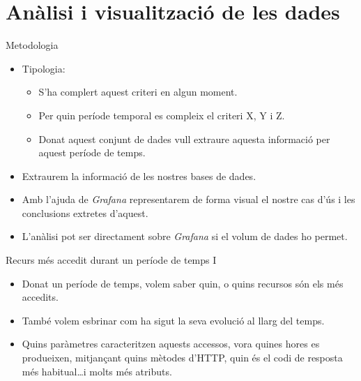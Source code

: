 \section{Anàlisi i visualització de les dades}\label{sec:data-analysis}

\begin{frame}{Metodologia}
    \begin{itemize}
        \item Tipologia:
        \begin{itemize}
            \item S’ha complert aquest criteri en algun moment.
            \item Per quin període temporal es compleix el criteri X, Y i Z.
            \item Donat aquest conjunt de dades vull extraure aquesta informació per aquest període de temps.
        \end{itemize}
        \item Extraurem la informació de les nostres bases de dades.
        \item Amb l’ajuda de \textit{Grafana} representarem de forma visual el nostre cas d’ús i les conclusions extretes d’aquest.
        \item L'anàlisi pot ser directament sobre \textit{Grafana} si el volum de dades ho permet.
    \end{itemize}
\end{frame}

\begin{frame}{Recurs més accedit durant un període de temps I}
    \begin{itemize}
        \item Donat un període de temps, volem saber quin, o quins recursos són els més accedits.
        \item També volem esbrinar com ha sigut la seva evolució al llarg del temps.
        \item Quins paràmetres caracteritzen aquests accessos, vora quines hores es produeixen, mitjançant quins mètodes d'HTTP, quin és el codi de resposta més habitual\dots i molts més atributs.
    \end{itemize}
\end{frame}

